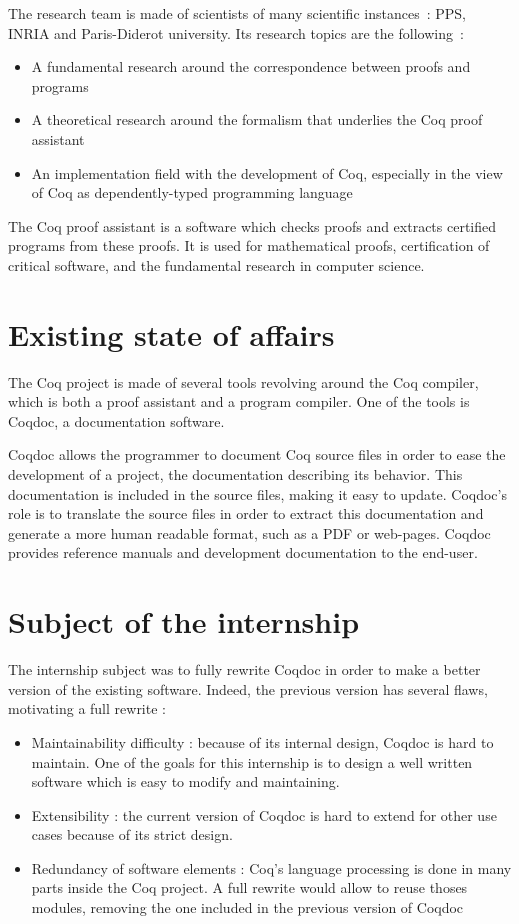 \documentclass[a4paper, 11pt]{article}
\begin{document}
The \pir research team is made of scientists of many scientific instances~: PPS,
INRIA and Paris-Diderot university. Its research topics are the following~:
\begin{itemize}
\item A fundamental research around the correspondence between proofs and programs
\item A theoretical research around the formalism that underlies the Coq proof assistant
\item An implementation field with the development of Coq, especially in the view of Coq as dependently-typed programming language
\end{itemize}
The Coq proof assistant is a software which checks proofs and extracts
certified programs from these proofs. It is used for mathematical proofs, certification
of critical software, and the fundamental research in computer science.

\section{Existing state of affairs}

The Coq project is made of several tools revolving around the Coq compiler, which
is both a proof assistant and a program compiler. One of the tools is Coqdoc,
a documentation software.

Coqdoc allows the programmer to document Coq source files in order to ease the
development of a project, the documentation describing its behavior. This
documentation is included in the source files, making it easy to update.
Coqdoc's role is to translate the source files in order to extract this documentation
and generate a more human readable format, such as a PDF or web-pages. Coqdoc provides
reference manuals and development documentation to the end-user.

\section{Subject of the internship}

The internship subject was to fully rewrite Coqdoc in order to make a better version
of the existing software. Indeed, the previous version has several flaws, motivating a full rewrite :
\begin{itemize}
\item Maintainability difficulty : because of its internal design, Coqdoc is hard
to maintain. One of the goals for this internship is to design a well written software
which is easy to modify and maintaining.
\item Extensibility : the current version of Coqdoc is hard to extend for other
use cases because of its strict design.
\item Redundancy of software elements : Coq's language processing is done in many
  parts inside the Coq project. A full rewrite would allow to reuse thoses
  modules, removing the one included in the previous version of Coqdoc
\end{itemize}
\end{document}
